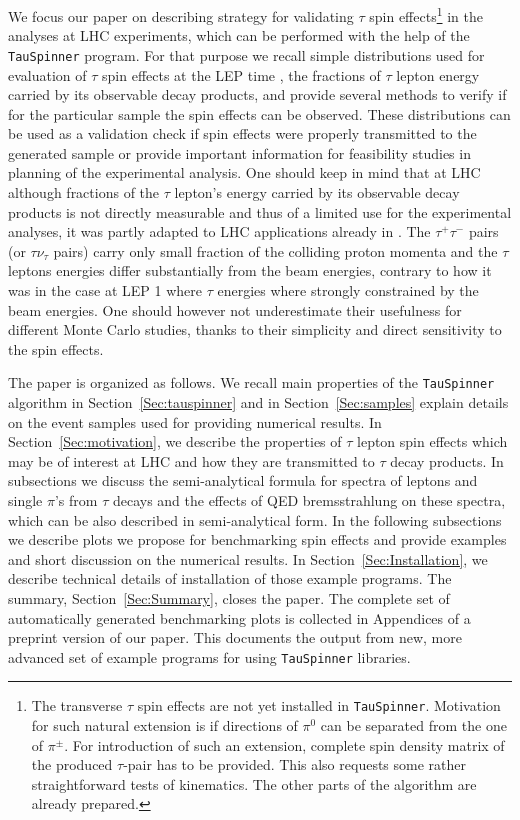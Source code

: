 \documentclass{article}
\begin{document}
We focus our paper on describing strategy for validating $\tau$ spin effects\footnote{The transverse $\tau$ spin effects are not yet installed in {\tt TauSpinner}. Motivation for such natural 
extension is if directions of $ \pi^0$ can be separated from the one  of
$ \pi^\pm$. For introduction of such an extension, complete spin density matrix of the
produced $\tau$-pair has to be provided. This also requests some rather straightforward 
tests of kinematics. The other parts of the algorithm  are already prepared.}
in the analyses at LHC experiments, which can be performed with the help of 
the {\tt TauSpinner} \cite{Czyczula:2012ny,Banerjee:2012ez} program.
For that purpose we recall  simple  distributions 
used for 
evaluation of $\tau$ spin effects at the LEP time \cite{Heister:2001uh,jadach-was:1984,Eberhard:1989ve},
the fractions of $\tau$ lepton energy carried by its observable decay products,
and provide several methods to verify if for the 
particular sample the spin effects can be observed. These distributions can 
be used as a validation check if spin effects were properly transmitted 
to the generated sample or provide important information for feasibility studies 
in planning of the experimental analysis. One should keep in mind that at LHC
although  fractions of the $\tau$ lepton's energy 
carried by its observable decay products is not directly measurable  
and thus of a limited use for the experimental analyses,  it was
partly adapted to LHC applications already in \cite{Pierzchala:2001gc}.
The $\tau^+ \tau^-$ pairs (or   $\tau \nu_\tau$ pairs) carry only  small fraction of the colliding proton momenta and the $\tau$ leptons 
 energies
differ substantially from the beam energies, contrary to how it was in the case at LEP 1
where $\tau$ energies where strongly constrained by the beam energies.
One should however not underestimate their usefulness for different Monte Carlo
studies, thanks to their simplicity and direct sensitivity to the spin effects. 

The paper is organized as follows. We recall main properties of the 
{\tt TauSpinner} algorithm in Section~\ref{Sec:tauspinner} and in Section~\ref{Sec:samples} explain details on the
event samples used for providing numerical results.
In Section~\ref{Sec:motivation}, we describe the properties of $\tau$ lepton spin effects which may be of interest 
at LHC and how they are transmitted to $\tau$ decay products.
In  subsections we discuss the semi-analytical formula for spectra of leptons and single $\pi$'s from $\tau$ decays 
and the effects of QED bremsstrahlung on these spectra, which can be also described in semi-analytical form.
In the following subsections we describe  plots 
we propose for benchmarking spin effects
and provide  examples  and short discussion on the numerical results. 
In Section~\ref{Sec:Installation}, we describe technical details of installation of those example programs. The 
summary, Section~\ref{Sec:Summary}, closes the paper.
The complete set of automatically generated benchmarking plots is collected  in Appendices
of a preprint version of our paper.
This documents the output from new, more advanced set of example programs for using {\tt TauSpinner}
libraries.
\end{document}
